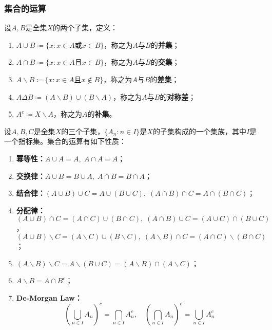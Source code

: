 \subsubsection{集合的运算}
\begin{definition}
	设$A,B$是全集$X$的两个子集，定义：
	\begin{enumerate}
		\item $A\cup B\coloneq\{x:x\in A\text{或}x\in B\}$，称之为$A$与$B$的\textbf{并集}；
		\item $A\cap B\coloneq\{x:x\in A\text{且}x\in B\}$，称之为$A$与$B$的\textbf{交集}；
		\item $A\backslash B\coloneq\{x:x\in A\text{且}x\notin B\}$，称之为$A$与$B$的\textbf{差集}；
		\item $A\Delta B\coloneq (A\backslash B)\cup(B\backslash A)$，称之为$A$与$B$的\textbf{对称差}；
		\item $A^c\coloneq X\backslash A$，称之为$A$的\textbf{补集}。
	\end{enumerate}
\end{definition}
\begin{property}\label{prop:SetOperation}
	设$A,B,C$是全集$X$的三个子集，$\{A_n:n\in I\}$是$X$的子集构成的一个集族，其中$I$是一个指标集。集合的运算有如下性质：
	\begin{enumerate}
		\item \textbf{幂等性：}$A\cup A=A,\;A\cap A=A$；
		\item \textbf{交换律：}$A\cup B=B\cup A,\;A\cap B=B\cap A$；
		\item \textbf{结合律：}$(A\cup B)\cup C=A\cup(B\cup C),\;(A\cap B)\cap C=A\cap(B\cap C)$；
		\item \textbf{分配律：}$(A\cup B)\cap C=(A\cap C)\cup(B\cap C),\;(A\cap B)\cup C=(A\cup C)\cap(B\cup C)$，$(A\cup B)\backslash C=(A\backslash C)\cup(B\backslash C),\;(A\backslash B)\cap C=(A\cap C)\backslash(B\cap C)$；
		\item $(A\backslash B)\backslash C=A\backslash(B\cup C)=(A\backslash B)\cap(A\backslash C)$；
		\item $A\backslash B=A\cap B^c$；
		\item \textbf{De-Morgan Law：}
		\begin{equation*}
			\left(\underset{n\in I}{\bigcup}A_n\right)^c=\underset{n\in I}{\bigcap}A_n^c,\quad
			\left(\underset{n\in I}{\bigcap}A_n\right)^c=\underset{n\in I}{\bigcup}A_n^c
		\end{equation*}
	\end{enumerate}
\end{property}
